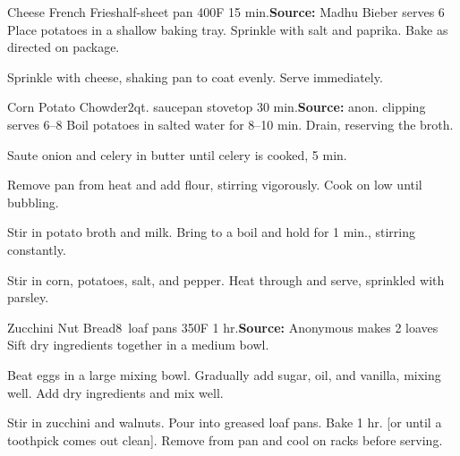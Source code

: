 \begin{recipe}{Cheese French Fries}{half-sheet pan \hfill 400\0F \hfill 15 min.}{\textbf{Source:} Madhu Bieber \hfill serves 6}
 Place potatoes in a shallow baking tray. Sprinkle with salt and paprika. Bake as directed on package.

 Sprinkle with cheese, shaking pan to coat evenly. Serve immediately.
\end{recipe}

\begin{recipe}{Corn \And Potato Chowder}{2qt. saucepan \hfill stovetop \hfill 30 min.}{\textbf{Source:} anon. clipping \hfill serves 6--8}
 Boil potatoes in salted water for 8--10 min. Drain, reserving the broth.

 Saute onion and celery in butter until celery is cooked, 5 min.

 Remove pan from heat and add flour, stirring vigorously. Cook on low until bubbling.

 Stir in potato broth and milk. Bring to a boil and hold for 1 min., stirring constantly.

 Stir in corn, potatoes, salt, and pepper. Heat through and serve, sprinkled with parsley.
\end{recipe}

\begin{recipe}{Zucchini Nut Bread}{8\inch{}\inch\ loaf pans \hfill 350\0F \hfill 1 hr.}{\textbf{Source:} Anonymous \hfill makes 2 loaves}
 Sift dry ingredients together in a medium bowl.

 Beat eggs in a large mixing bowl. Gradually add sugar, oil, and vanilla, mixing well. Add dry ingredients and mix well.

 Stir in zucchini and walnuts. Pour into greased loaf pans. Bake 1 hr. [or until a toothpick comes out clean]. Remove from pan and cool on racks before serving.
\end{recipe}

